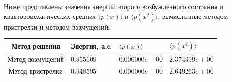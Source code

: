 Ниже представлены значения энергий второго возбужденного состояния и квантовомеханических средних $\langle p(x) \rangle$ и $\langle p(x^2) \rangle$,
вычисленные методом пристрелки и методом возмущений:


\noindent
\begin{tabularx}{\linewidth}{|c|X|X|X|}
    \hline
    \textbf{Метод решения}&\textbf{Энергия, а.е.}&\textbf{$\langle p(x) \rangle$}&\textbf{$\langle p(x^2) \rangle$} \\
    \hline
    Метод возмущений & $0.855608$ & $0.000000e+00$ & $2.374319e+00$\\
    \hline
    Метод пристрелки & $0.848595$ & $0.000000e+00$ & $2.649263e+00$\\
    \hline
\end{tabularx}
\newpage
